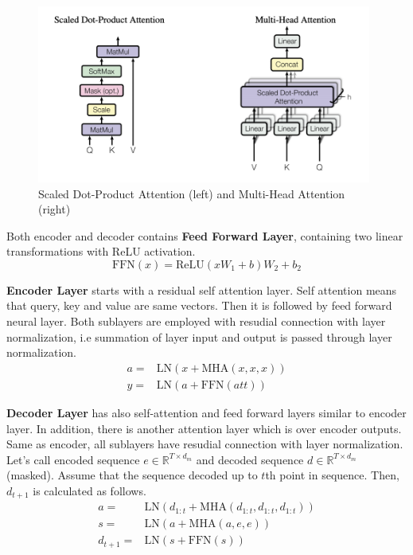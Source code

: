 \begin{figure}
	\centering
	\includegraphics[width=0.98\textwidth]{figures/ml_theory/att.png}
	\caption{Scaled Dot-Product Attention (left) and Multi-Head Attention (right)}
	\label{fig:att_and_mha}
\end{figure}

Both encoder and decoder contains \textbf{Feed Forward Layer}, containing two linear transformations with ReLU activation.
\begin{equation}
\mathrm{FFN}(x) = \text{ReLU}(xW_1+b)W_2+b_2
\end{equation}

\textbf{Encoder Layer} starts with a residual self attention layer. 
Self attention means that query, key and value are same vectors. 
Then it is followed by feed forward neural layer. 
Both sublayers are employed with resudial connection with layer normalization, 
i.e summation of layer input and output is passed through layer normalization. 
\begin{equation}
\begin{split}
a = & \mathrm{LN}(x + \mathrm{MHA}(x,x,x)) \\
y = & \mathrm{LN}(a + \mathrm{FFN}(att))
\end{split}
\end{equation}

\textbf{Decoder Layer} has also self-attention and feed forward layers similar to encoder layer. 
In addition, there is another attention layer which is over encoder outputs. 
Same as encoder, all sublayers have resudial connection with layer normalization. 
Let's call encoded sequence $e \in \mathbb{R}^{T \times d_m}$ and decoded sequence $d \in \mathbb{R}^{T \times d_m}$ (masked). 
Assume that the sequence decoded up to $t$th point in sequence. 
Then, $d_{t+1}$ is calculated as follows. 
\begin{equation}
\begin{split}
a = & \mathrm{LN}(d_{1:t}+\mathrm{MHA}(d_{1:t},d_{1:t},d_{1:t})) \\
s = & \mathrm{LN}(a + \mathrm{MHA}(a,e,e)) \\
d_{t+1} = & \mathrm{LN}(s+ \mathrm{FFN}(s))
\end{split}
\end{equation}

